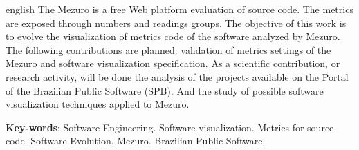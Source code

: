 \begin{resumo}[Abstract]
 \begin{otherlanguage*}{english}
   The Mezuro is a free Web platform evaluation of source code. The metrics are
   exposed through numbers and readings groups. The objective of this work is
   to evolve the visualization of metrics code of the software analyzed by
   Mezuro.
   The following contributions are planned: validation of metrics settings of
   the Mezuro and software visualization specification.
   As a scientific contribution, or research activity, will be done the analysis
   of the projects available on the Portal of the Brazilian Public Software
   (SPB).
   And the study of possible software visualization techniques applied to
   Mezuro.

   \vspace{\onelineskip}

   \noindent
   \textbf{Key-words}: Software Engineering. Software visualization. Metrics
   for source code. Software Evolution. Mezuro. Brazilian Public Software.
 \end{otherlanguage*}
\end{resumo}
